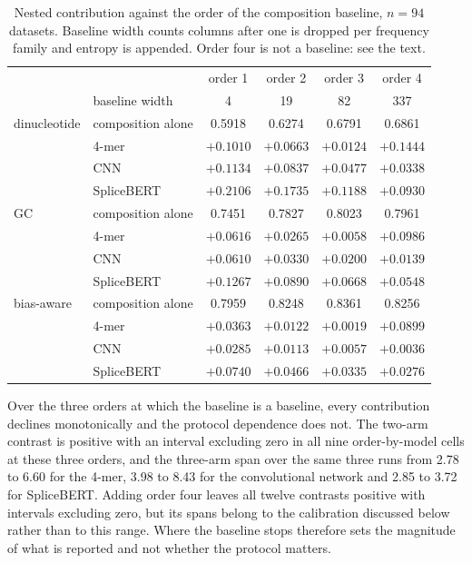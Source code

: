 \begin{table}[htbp]
\centering
\caption{Nested contribution against the order of the composition baseline, $n=94$ datasets.
Baseline width counts columns after one is dropped per frequency family and entropy is
appended. Order four is not a baseline: see the text.}
\label{tab:profile}
\begin{tabular}{llcccc}
\toprule
 & & order 1 & order 2 & order 3 & order 4 \\
 & baseline width & 4 & 19 & 82 & 337 \\
\midrule
dinucleotide & composition alone & 0.5918 & 0.6274 & 0.6791 & 0.6861 \\
 & 4-mer & $+0.1010$ & $+0.0663$ & $+0.0124$ & $+0.1444$ \\
 & CNN & $+0.1134$ & $+0.0837$ & $+0.0477$ & $+0.0338$ \\
 & SpliceBERT & $+0.2106$ & $+0.1735$ & $+0.1188$ & $+0.0930$ \\
\midrule
GC & composition alone & 0.7451 & 0.7827 & 0.8023 & 0.7961 \\
 & 4-mer & $+0.0616$ & $+0.0265$ & $+0.0058$ & $+0.0986$ \\
 & CNN & $+0.0610$ & $+0.0330$ & $+0.0200$ & $+0.0139$ \\
 & SpliceBERT & $+0.1267$ & $+0.0890$ & $+0.0668$ & $+0.0548$ \\
\midrule
bias-aware & composition alone & 0.7959 & 0.8248 & 0.8361 & 0.8256 \\
 & 4-mer & $+0.0363$ & $+0.0122$ & $+0.0019$ & $+0.0899$ \\
 & CNN & $+0.0285$ & $+0.0113$ & $+0.0057$ & $+0.0036$ \\
 & SpliceBERT & $+0.0740$ & $+0.0466$ & $+0.0335$ & $+0.0276$ \\
\bottomrule
\end{tabular}
\end{table}

Over the three orders at which the baseline is a baseline, every contribution declines
monotonically and the protocol dependence does not. The two-arm contrast is positive with an
interval excluding zero in all nine order-by-model cells at these three orders, and the
three-arm span over the same three runs from 2.78 to 6.60 for the 4-mer, 3.98 to 8.43 for the
convolutional network and 2.85 to 3.72 for SpliceBERT. Adding order four leaves all twelve
contrasts positive with intervals excluding zero, but its spans belong to the calibration
discussed below rather than to this range. Where the baseline stops therefore sets the magnitude of what is reported and not
whether the protocol matters.

